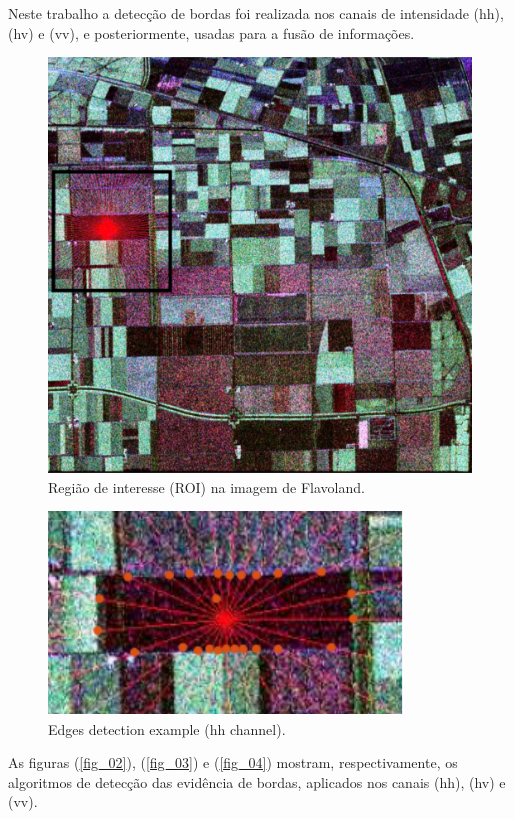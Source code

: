 \documentclass[conference]{IEEEtran}
\begin{document}
Neste trabalho a detecção de bordas foi realizada nos canais de intensidade (hh), (hv) e (vv), e posteriormente, usadas para a fusão de informações.   
\begin{figure}[hbt]
\centering
	\includegraphics[scale=0.3]{flevoland_radial_4_look_black.pdf}
	\caption{Região de interesse (ROI) na imagem de Flavoland.}
\label{fig_01}
\end{figure}



\begin{figure}[hbt]
\centering
	\includegraphics[width=.7\linewidth]{flevoland_radial_25_point_hh_crop}
	\caption{Edges detection example ($\text{hh}$ channel).}
\label{fig1}
\end{figure}

As figuras (\ref{fig_02}), (\ref{fig_03}) e (\ref{fig_04}) mostram, respectivamente, os algoritmos de detecção das evidência de bordas, aplicados nos canais (hh), (hv) e (vv). 
\end{document}
